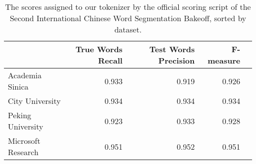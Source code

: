 \begin{table}
  \begin{center}
    \begin{tabular}{ | l | r | r | r | r | }
      \hline
      & True Words Recall & Test Words Precision & F-measure \\ \hline
      Academia Sinica & 0.933 & 0.919 & 0.926 \\ \hline
      City University & 0.934 & 0.934 & 0.934 \\ \hline
      Peking University & 0.923 & 0.933 & 0.928 \\ \hline
      Microsoft Research & 0.951 & 0.952 & 0.951 \\
      \hline
    \end{tabular}
  \end{center}
  \caption[Chinese Word Segmentation scores]
    {The scores assigned to our tokenizer by the official scoring script of the
    Second International Chinese Word Segmentation Bakeoff, sorted by dataset.}
  \label{tbl:bakeoff-score}
\end{table}

